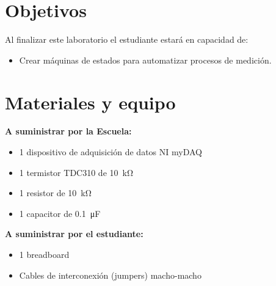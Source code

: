 \documentclass[12pt,letterpaper]{report}
\newcommand{\obj}{Objetivos}
\newcommand{\mat}{Materiales y equipo}
\newcommand{\capacidad}{Al finalizar este laboratorio el estudiante estará en capacidad de:}
\begin{document}
\section{\obj}
\capacidad
\begin{itemize}
\item Crear máquinas de estados para automatizar procesos de medición.
\end{itemize}

\section{\mat}
\textbf{A suministrar por la Escuela:}
\begin{itemize}
\item 1 dispositivo de adquisición de datos NI myDAQ
\item 1 termistor TDC310 de \SI{10}{\kilo\ohm} 
\item 1 resistor de \SI{10}{\kilo\ohm}
\item 1 capacitor de \SI{0.1}{\micro\farad}

\end{itemize}
\textbf{A suministrar por el estudiante:}
\begin{itemize}
\item 1 breadboard
\item Cables de interconexión (jumpers) macho-macho
\end{itemize}
\end{document}
